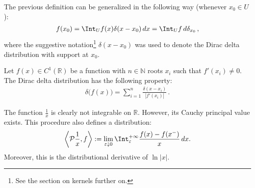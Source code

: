 	\begin{property}\label{distribution:sieving_dirac_delta}
    	The previous definition can be generalized in the following way (whenever $x_0\in U$):
    	\begin{gather}
			f(x_0) = \Int_Uf(x)\delta(x - x_0)\,dx=\Int_Uf\,d\delta_{x_0}\,,
		\end{gather}
		where the suggestive notation\footnote{See the section on kernels further on.} $\delta(x-x_0)$ was used to denote the Dirac delta distribution with support at $x_0$.
	\end{property}


	\begin{property}[Transformation]\label{distribution:delta_of_function}
		Let $f(x)\in C^1(\mathbb{R})$ be a function with $n\in\mathbb{N}$ roots $x_i$ such that $f'(x_i)\neq0$. The Dirac delta distribution has the following property:
		\begin{gather}
			\delta\bigl(f(x)\bigr) = \sum_{i=1}^n\frac{\delta(x-x_i)}{|f'(x_i)|}\,.
		\end{gather}
	\end{property}


    \begin{example}
        The function $\frac{1}{x}$ is clearly not integrable on $\mathbb{R}$. However, its Cauchy principal value exists. This procedure also defines a distribution:
        \begin{gather}
            \left\langle\mathcal{P}\frac{1}{x},f\right\rangle := \lim_{\varepsilon\downarrow0}\Int_\varepsilon^{+\infty}\frac{f(x)-f(x^-)}{x}\,dx.
        \end{gather}
        Moreover, this is the distributional derivative of $\ln|x|$.
    \end{example}

